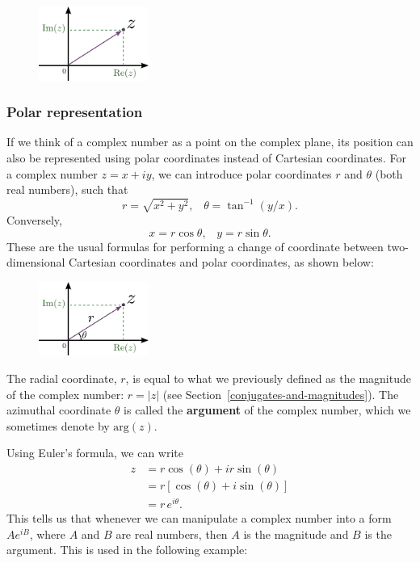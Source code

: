 \documentclass[10pt,a4paper]{article}
\begin{document}
\begin{figure}[h]
  \centering\includegraphics[width=0.32\textwidth]{complex_plane}
\end{figure}

\hypertarget{polar-representation}{%
\subsubsection{Polar representation}\label{polar-representation}}

If we think of a complex number as a point on the complex plane, its
position can also be represented using polar coordinates instead of
Cartesian coordinates. For a complex number $z = x + i y$, we can
introduce polar coordinates $r$ and $\theta$ (both real numbers),
such that
\begin{equation}
r = \sqrt{x^2 + y^2}, \;\;\; \theta = \tan^{-1}(y/x).
\end{equation}
Conversely,
\begin{equation}
x = r\cos\theta, \;\;\; y = r\sin\theta.
\end{equation}
These are the usual formulas for performing a change of coordinate
between two-dimensional Cartesian coordinates and polar coordinates,
as shown below:

\begin{figure}[h]
  \centering\includegraphics[width=0.32\textwidth]{complex_plane2}
\end{figure}

\noindent
The radial coordinate, $r$, is equal to what we previously defined as
the magnitude of the complex number: $r = |z|$ (see
Section~\ref{conjugates-and-magnitudes}). The azimuthal coordinate
$\theta$ is called the \textbf{argument} of the complex number, which
we sometimes denote by $\mathrm{arg}(z)$.

Using Euler's formula, we can write
\begin{align}
  z &= r\cos(\theta) + i r\sin(\theta)\\&= r \left[\cos(\theta) + i \sin(\theta)\right] \\&= r \, e^{i\theta}.
\end{align}
This tells us that whenever we can manipulate a complex number into a
form $A e^{iB}$, where $A$ and $B$ are real numbers, then $A$ is
the magnitude and $B$ is the argument. This is used in the following
example:
\end{document}
